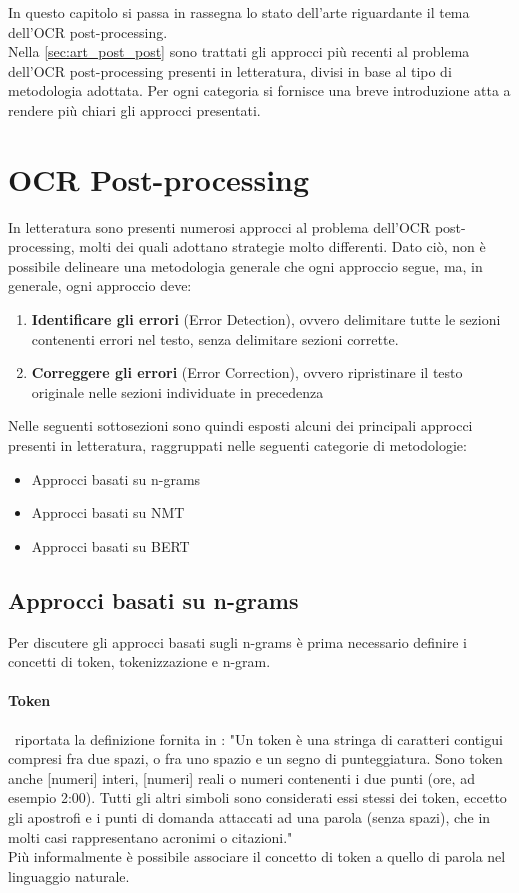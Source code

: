 In questo capitolo si passa in rassegna lo stato dell'arte riguardante il tema dell'OCR post-processing.\\
Nella \autoref{sec:art_post_post} sono trattati gli approcci più recenti al problema dell'OCR post-processing presenti in letteratura, divisi in base al tipo di metodologia adottata. Per ogni categoria si fornisce una breve introduzione atta a rendere più chiari gli approcci presentati.
\section{OCR Post-processing}
\label{sec:art_post_post}
In letteratura sono presenti numerosi approcci al problema dell'OCR post-processing, molti dei quali adottano strategie molto differenti. Dato ciò, non è possibile delineare una metodologia generale che ogni approccio segue, ma, in generale, ogni approccio deve:
\begin{enumerate}
\item \textbf{Identificare gli errori} (Error Detection), ovvero delimitare tutte le sezioni contenenti errori nel testo, senza delimitare sezioni corrette.
\item \textbf{Correggere gli errori} (Error Correction), ovvero ripristinare il testo originale nelle sezioni individuate in precedenza
\end{enumerate}

Nelle seguenti sottosezioni sono quindi esposti alcuni dei principali approcci presenti in letteratura, raggruppati nelle seguenti categorie di metodologie:
\begin{itemize}
\item Approcci basati su n-grams
\item Approcci basati su NMT
\item Approcci basati su BERT
\end{itemize}

\subsection{Approcci basati su n-grams}
Per discutere gli approcci basati sugli n-grams è prima necessario definire i concetti di token, tokenizzazione e n-gram. 

\paragraph{Token}
\E\ riportata la definizione fornita in \cite{tokendef}: "Un token è una stringa di caratteri contigui compresi fra due spazi, o fra uno spazio e un segno di punteggiatura. Sono token anche [numeri] interi, [numeri] reali o numeri contenenti i due punti (ore, ad esempio 2:00). Tutti gli altri simboli sono considerati essi stessi dei token, eccetto gli apostrofi e i punti di domanda attaccati ad una parola (senza spazi), che in molti casi rappresentano acronimi o citazioni."\\
Più informalmente è possibile associare il concetto di token a quello di parola nel linguaggio naturale.

